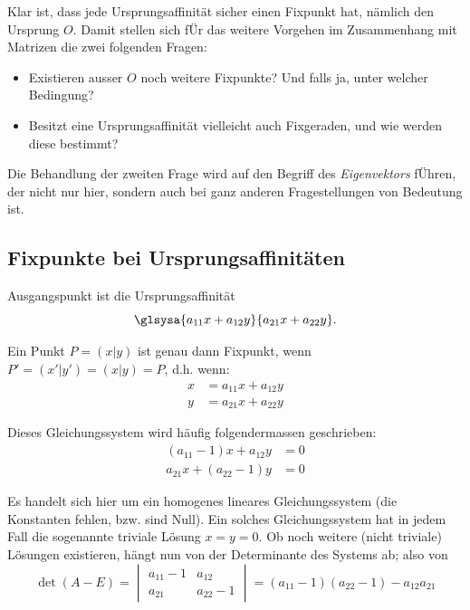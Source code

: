\documentclass[%
11pt,%
twoside,%
titlepage,%
german,%
headsepline%
]{scrartcl}
\begin{document}
Klar ist, dass jede Ursprungsaffinität sicher einen Fixpunkt hat, nämlich den Ursprung $O$. Damit stellen sich f\"Ur das weitere Vorgehen im Zusammenhang mit Matrizen die zwei folgenden Fragen:

\begin{itemize}
\item Existieren ausser $O$ noch weitere Fixpunkte? Und falls ja, unter welcher Bedingung?
\item Besitzt eine Ursprungsaffinität vielleicht auch Fixgeraden, und wie werden diese bestimmt?
\end{itemize}

Die Behandlung der zweiten Frage wird auf den Begriff des \emph{Eigenvektors} f\"Uhren, der nicht nur hier, sondern auch bei ganz anderen Fragestellungen von Bedeutung ist.

\subsection{Fixpunkte bei Ursprungsaffinitäten}

Ausgangspunkt ist die Ursprungsaffinität
$$\glsysa{a_{11}x+a_{12}y}{a_{21}x+a_{22}y}.$$

Ein Punkt $P =(x|y)$ ist genau dann Fixpunkt, wenn $P' =(x'|y') =(x|y)=P$, d.h. wenn:
\begin{align*}
x &= a_{11}x+a_{12}y\\
y &= a_{21}x+a_{22}y
\end{align*}

Dieses Gleichungssystem wird häufig folgendermassen geschrieben:
\begin{align*}
(a_{11}-1)x+a_{12}y & = 0\\
a_{21}x+(a_{22}-1)y & = 0
\end{align*}

Es handelt sich hier um ein homogenes lineares Gleichungssystem (die Konstanten fehlen, bzw. sind Null). Ein solches Gleichungssystem hat in jedem Fall die sogenannte triviale Lösung $x = y = 0$. Ob noch weitere (nicht triviale) Lösungen existieren, hängt nun von der Determinante des Systems ab; also von
$$
\det(A-E)=
\begin{vmatrix}
a_{11}-1 & a_{12}\\
a_{21} & a_{22}-1
\end{vmatrix}
= (a_{11}-1)(a_{22}-1)-a_{12}a_{21}
$$
\end{document}
